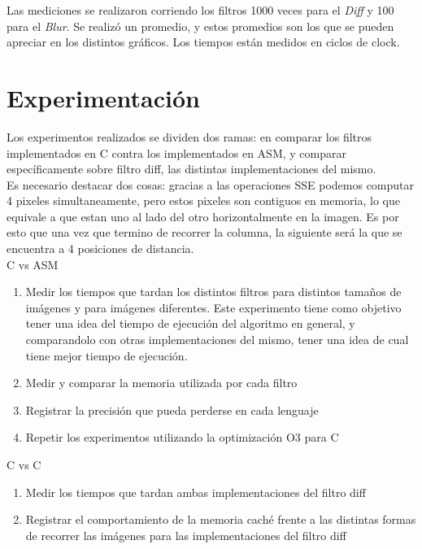 \documentclass[10pt,a4paper,spanish]{article}
\begin{document}
Las mediciones se realizaron corriendo los filtros 1000 veces para el \textit{Diff} y 100 para el \textit{Blur}. Se realizó un promedio, y estos promedios son los que se pueden apreciar en los distintos gráficos. Los tiempos están medidos en ciclos de clock.

\section{Experimentación}

Los experimentos realizados se dividen dos ramas: en comparar los filtros implementados en C contra los implementados en ASM, y comparar específicamente sobre filtro diff, las distintas implementaciones del mismo. \\

Es necesario destacar dos cosas: gracias a las operaciones SSE podemos computar 4 pixeles simultaneamente, pero estos pixeles son contiguos en memoria, lo que equivale a que estan uno al lado del otro horizontalmente en la imagen. Es por esto que una vez que termino de recorrer la columna, la siguiente será la que se encuentra a 4 posiciones de distancia. \\

C vs ASM

\begin{enumerate}
	\item Medir los tiempos que tardan los distintos filtros para distintos tamaños de imágenes y para imágenes diferentes. Este experimento tiene como objetivo tener una idea del tiempo de ejecución del algoritmo en general, y comparandolo con otras implementaciones del mismo, tener una idea de cual tiene mejor tiempo de ejecución.
	\item Medir y comparar la memoria utilizada por cada filtro
	\item Registrar la precisión que pueda perderse en cada lenguaje
	\item Repetir los experimentos utilizando la optimización O3 para C
\end{enumerate}

C vs C

\begin{enumerate}
	\item Medir los tiempos que tardan ambas implementaciones del filtro diff
	\item Registrar el comportamiento de la memoria caché frente a las distintas formas de recorrer las imágenes para las implementaciones del filtro diff
\end{enumerate}
\end{document}
